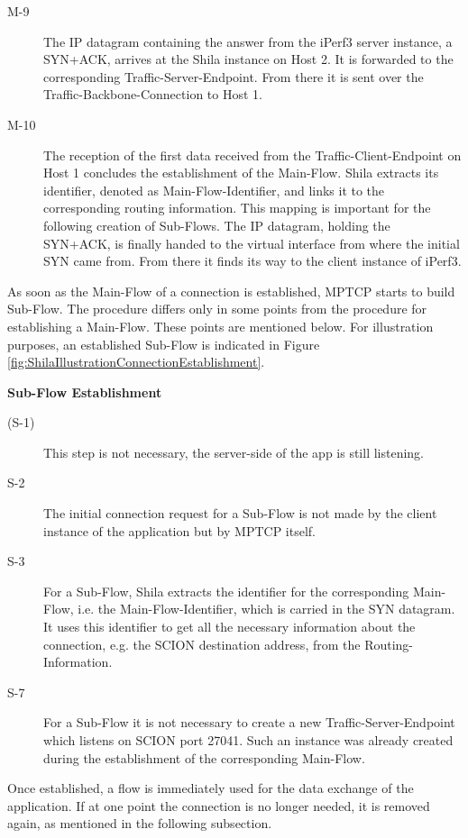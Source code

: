 \begin{description}
	\item[M-9] The IP datagram containing the answer from the iPerf3 server instance, a SYN+ACK, arrives at the Shila instance on Host 2. It is forwarded to the corresponding Traffic-Server-Endpoint. From there it is sent over the Traffic-Backbone-Connection to Host 1.
	\item[M-10] The reception of the first data received from the Traffic-Client-Endpoint on Host 1 concludes the establishment of the Main-Flow. Shila extracts its identifier, denoted as Main-Flow-Identifier, and links it to the corresponding routing information. This mapping is important for the following creation of Sub-Flows. The IP datagram, holding the SYN+ACK, is finally handed to the virtual interface from where the initial SYN came from. From there it finds its way to the client instance of iPerf3.
\end{description}

As soon as the Main-Flow of a connection is established, MPTCP starts to build Sub-Flow. The procedure differs only in some points from the procedure for establishing a Main-Flow. These points are mentioned below. For illustration purposes, an established Sub-Flow is indicated in Figure \ref{fig:ShilaIllustrationConnectionEstablishment}.

\textbf{Sub-Flow Establishment}

\begin{description}
	\item[(S-1)] This step is not necessary, the server-side of the app is still listening.
	\item[S-2] The initial connection request for a Sub-Flow is not made by the client instance of the application but by MPTCP itself.
	\item[S-3] For a Sub-Flow, Shila extracts the identifier for the corresponding Main-Flow, i.e. the Main-Flow-Identifier, which is carried in the  SYN datagram. It uses this identifier to get all the necessary information about the connection, e.g. the SCION destination address, from the Routing-Information.
	\item[S-7] For a Sub-Flow it is not necessary to create a new Traffic-Server-Endpoint which listens on SCION port {\footnotesize 27041}. Such an instance was already created during the establishment of the corresponding Main-Flow.
\end{description} 

Once established, a flow is immediately used for the data exchange of the application. If at one point the connection is no longer needed, it is removed again, as mentioned in the following subsection.

